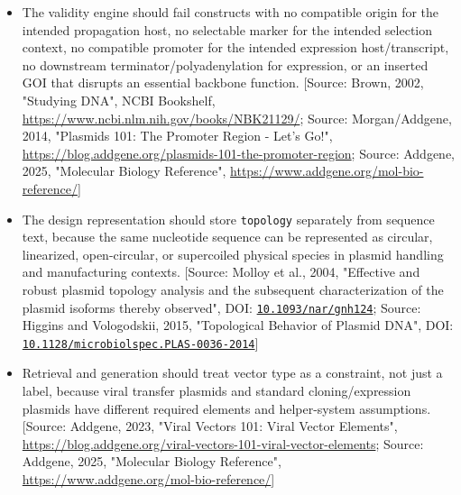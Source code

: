 \documentclass[11pt]{report}
\begin{document}
\begin{itemize}
\item The validity engine should fail constructs with no compatible origin for the intended propagation host, no selectable marker for the intended selection context, no compatible promoter for the intended expression host/transcript, no downstream terminator/polyadenylation for expression, or an inserted GOI that disrupts an essential backbone function. [Source: Brown, 2002, "Studying DNA", NCBI Bookshelf, \url{https://www.ncbi.nlm.nih.gov/books/NBK21129/}; Source: Morgan/Addgene, 2014, "Plasmids 101: The Promoter Region - Let's Go!", \url{https://blog.addgene.org/plasmids-101-the-promoter-region}; Source: Addgene, 2025, "Molecular Biology Reference", \url{https://www.addgene.org/mol-bio-reference/}]
\item The design representation should store \texttt{topology} separately from sequence text, because the same nucleotide sequence can be represented as circular, linearized, open-circular, or supercoiled physical species in plasmid handling and manufacturing contexts. [Source: Molloy et al., 2004, "Effective and robust plasmid topology analysis and the subsequent characterization of the plasmid isoforms thereby observed", DOI: \href{https://doi.org/10.1093/nar/gnh124}{\nolinkurl{10.1093/nar/gnh124}}; Source: Higgins and Vologodskii, 2015, "Topological Behavior of Plasmid DNA", DOI: \href{https://doi.org/10.1128/microbiolspec.PLAS-0036-2014}{\nolinkurl{10.1128/microbiolspec.PLAS-0036-2014}}]
\item Retrieval and generation should treat vector type as a constraint, not just a label, because viral transfer plasmids and standard cloning/expression plasmids have different required elements and helper-system assumptions. [Source: Addgene, 2023, "Viral Vectors 101: Viral Vector Elements", \url{https://blog.addgene.org/viral-vectors-101-viral-vector-elements}; Source: Addgene, 2025, "Molecular Biology Reference", \url{https://www.addgene.org/mol-bio-reference/}]
\end{itemize}
\end{document}
